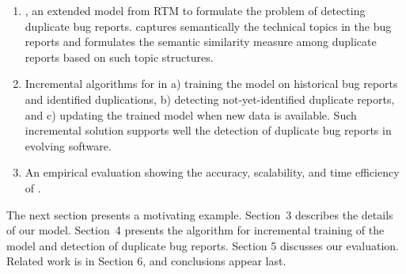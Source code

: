 \begin{enumerate}

\item {\model}, an extended model from RTM to formulate the problem of
detecting duplicate bug reports.
{\model} captures semantically the technical topics in the bug reports
and formulates the semantic similarity measure among duplicate reports
based on such topic structures.

\item Incremental algorithms for {\model} in a) training the model on
historical bug reports and identified duplications, b) detecting
not-yet-identified duplicate reports, and c) updating the trained
model when new data is available. Such incremental solution supports
well the detection of duplicate bug reports in evolving software.

\item An empirical evaluation showing the accuracy, scalability, and
time efficiency of {\model}.

\end{enumerate}

The next section presents a motivating example. Section~3 describes
the details of our model. Section~4 presents the algorithm for
incremental training of the model and detection of duplicate bug
reports. Section 5 discusses our evaluation. Related work is in
Section 6, and conclusions appear last.
